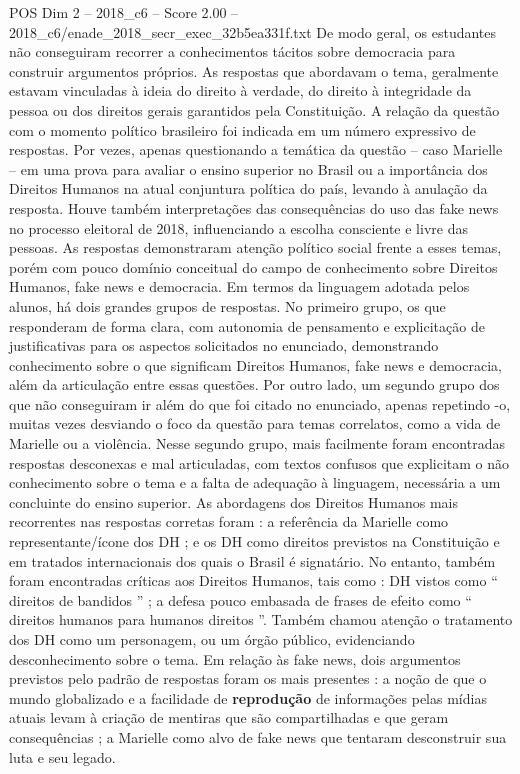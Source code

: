 \begin{textsample}{POS Dim 2 – 2018\_c6 – Score 2.00 – 2018\_c6/enade\_2018\_secr\_exec\_32b5ea331f.txt}
De modo geral, os estudantes não conseguiram recorrer a conhecimentos tácitos sobre democracia para construir argumentos próprios.
As respostas que abordavam o tema, geralmente estavam vinculadas à ideia do direito à verdade, do direito à integridade da pessoa ou dos direitos gerais garantidos pela Constituição.
A relação da questão com o momento político brasileiro foi indicada em um número expressivo de respostas.
Por vezes, apenas questionando a temática da questão – caso Marielle – em uma prova para avaliar o ensino superior no Brasil ou a importância dos Direitos Humanos na atual conjuntura política do país, levando à anulação da resposta.
Houve também interpretações das consequências do uso das fake news no processo eleitoral de 2018, influenciando a escolha consciente e livre das pessoas.
As respostas demonstraram atenção político social frente a esses temas, porém com pouco domínio conceitual do campo de conhecimento sobre Direitos Humanos, fake news e democracia.
Em termos da linguagem adotada pelos alunos, há dois grandes grupos de respostas.
No primeiro grupo, os que responderam de forma clara, com autonomia de pensamento e explicitação de justificativas para os aspectos solicitados no enunciado, demonstrando conhecimento sobre o que significam Direitos Humanos, fake news e democracia, além da articulação entre essas questões.
Por outro lado, um segundo grupo dos que não conseguiram ir além do que foi citado no enunciado, apenas repetindo -o, muitas vezes desviando o foco da questão para temas correlatos, como a vida de Marielle ou a violência.
Nesse segundo grupo, mais facilmente foram encontradas respostas desconexas e mal articuladas, com textos confusos que explicitam o não conhecimento sobre o tema e a falta de adequação à linguagem, necessária a um concluinte do ensino superior.
As abordagens dos Direitos Humanos mais recorrentes nas respostas corretas foram : a referência da Marielle como representante/ícone dos DH ; e os DH como direitos previstos na Constituição e em tratados internacionais dos quais o Brasil é signatário.
No entanto, também foram encontradas críticas aos Direitos Humanos, tais como : DH vistos como “ direitos de bandidos ” ; a defesa pouco embasada de frases de efeito como “ direitos humanos para humanos direitos ”.
Também chamou atenção o tratamento dos DH como um personagem, ou um órgão público, evidenciando desconhecimento sobre o tema.
Em relação às fake news, dois argumentos previstos pelo padrão de respostas foram os mais presentes : a noção de que o mundo globalizado e a facilidade de \textbf{reprodução} de informações pelas mídias atuais levam à criação de mentiras que são compartilhadas e que geram consequências ; a Marielle como alvo de fake news que tentaram desconstruir sua luta e seu legado.

\end{textsample}
